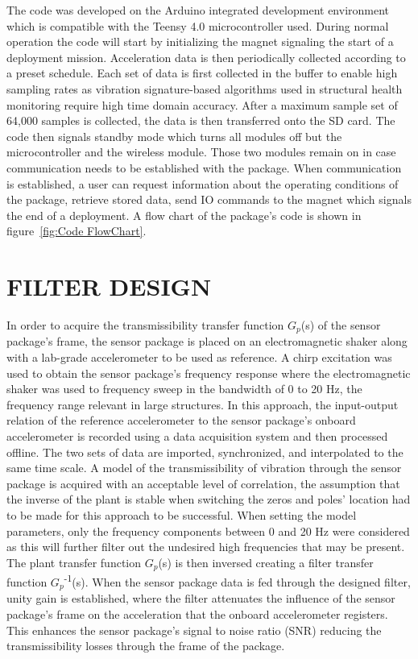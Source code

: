 \documentclass[]{spie}  %
\begin{document}
	The code was developed on the Arduino integrated development environment which is compatible with the Teensy 4.0 microcontroller used. During normal operation the code will start by initializing the magnet signaling the start of a deployment mission. Acceleration data is then periodically collected according to a preset schedule. Each set of data is first collected in the buffer to enable high sampling rates as vibration signature-based algorithms used in structural health monitoring require high time domain accuracy. After a maximum sample set of 64,000 samples is collected, the data is then transferred onto the SD card. The code then signals standby mode which turns all modules off but the microcontroller and the wireless module. Those two modules remain on in case communication needs to be established with the package. When communication is established, a user can request information about the operating conditions of the package, retrieve stored data, send IO commands to the magnet which signals the end of a deployment. A flow chart of the package’s code is shown in figure~\ref{fig:Code FlowChart}.
	
	\section{FILTER DESIGN}
	In order to acquire the transmissibility transfer function $G_p$(s) of the sensor package’s frame, the sensor package is placed on an electromagnetic shaker along with a lab-grade accelerometer to be used as reference. A chirp excitation was used to obtain the sensor package’s frequency response where the electromagnetic shaker was used to frequency sweep in the bandwidth of 0 to 20 Hz, the frequency range relevant in large structures. In this approach, the input-output relation of the reference accelerometer to the sensor package’s onboard accelerometer is recorded using a data acquisition system and then processed offline. The two sets of data are imported, synchronized, and interpolated to the same time scale. A model of the transmissibility of vibration through the sensor package is acquired with an acceptable level of correlation, the assumption that the inverse of the plant is stable when switching the zeros and poles’ location had to be made for this approach to be successful. When setting the model parameters, only the frequency components between 0 and 20 Hz were considered as this will further filter out the undesired high frequencies that may be present. The plant transfer function $G_p$(s) is then inversed creating a filter transfer function $G_p$\textsuperscript{-1}(s). When the sensor package data is fed through the designed filter, unity gain is established, where the filter attenuates the influence of the sensor package’s frame on the acceleration that the onboard accelerometer registers. This enhances the sensor package’s signal to noise ratio (SNR) reducing the transmissibility losses through the frame of the package. 
	
\end{document}
